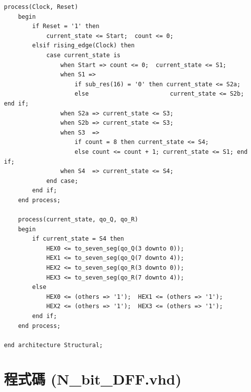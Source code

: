 \documentclass[12pt, a4paper]{article}
\begin{document}
\begin{lstlisting}[style=vhdlstyle, caption={Division.vhd --- 8-bit 恢復除法器頂層模組（結構化架構）}]
    process(Clock, Reset)
    begin
        if Reset = '1' then
            current_state <= Start;  count <= 0;
        elsif rising_edge(Clock) then
            case current_state is
                when Start => count <= 0;  current_state <= S1;
                when S1 =>
                    if sub_res(16) = '0' then current_state <= S2a;
                    else                       current_state <= S2b; end if;
                when S2a => current_state <= S3;
                when S2b => current_state <= S3;
                when S3  =>
                    if count = 8 then current_state <= S4;
                    else count <= count + 1; current_state <= S1; end if;
                when S4  => current_state <= S4;
            end case;
        end if;
    end process;

    process(current_state, qo_Q, qo_R)
    begin
        if current_state = S4 then
            HEX0 <= to_seven_seg(qo_Q(3 downto 0));
            HEX1 <= to_seven_seg(qo_Q(7 downto 4));
            HEX2 <= to_seven_seg(qo_R(3 downto 0));
            HEX3 <= to_seven_seg(qo_R(7 downto 4));
        else
            HEX0 <= (others => '1');  HEX1 <= (others => '1');
            HEX2 <= (others => '1');  HEX3 <= (others => '1');
        end if;
    end process;

end architecture Structural;
\end{lstlisting}

\newpage

\section{程式碼 (N\_bit\_DFF.vhd)}
\end{document}
